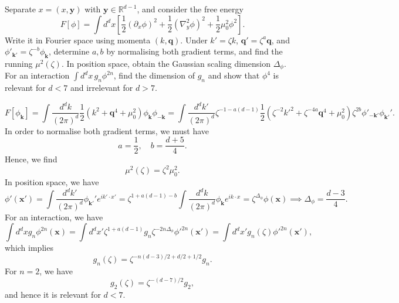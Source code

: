 Separate $x=(x,\mathbf y)$ with $\mathbf y\in\mathbb R^{d-1}$, and
consider the free energy
\begin{equation}
    F[\phi]=\int d^dx\left[
    \frac12(\partial_x\phi)^2
    +\frac12(\nabla_{\!y}^{2}\phi)^2
    +\frac12\mu_0^2\phi^2\right].
\end{equation}
Write it in Fourier space using momenta $(k,\mathbf q)$. Under
$k'=\zeta k$, $\mathbf q'=\zeta^a\mathbf q$, and
$\phi'_{\mathbf{k}'}=\zeta^{-b}\phi_\mathbf{k}$, determine $a,b$ by normalising both
gradient terms, and find the running $\mu^2(\zeta)$.
In position space, obtain the Gaussian scaling dimension $\Delta_\phi$.
For an interaction $\int d^dx\,g_n\phi^{2n}$, find the dimension of
$g_n$ and show that $\phi^4$ is relevant for $d<7$ and irrelevant
for $d>7$.
\begin{solution}
    \begin{equation}
        F[\phi_\mathbf{k}] = \int \frac{d^dk}{(2\pi)^d}\frac{1}{2}(k^2 + \mathbf{q}^4 + \mu_0^2) \phi_\mathbf{k}\phi_{-\mathbf{k}} = \int \frac{d^dk'}{(2\pi)^d}\zeta^{-1-a(d-1)}\frac{1}{2}(\zeta^{-2}k'^2 + \zeta^{-4a}\mathbf{q}^4 + \mu^2_0)\zeta^{2b}\phi'_{-\mathbf{k}'}\phi_{\mathbf{k}'}'.
    \end{equation}
    In order to normalise both gradient terms, we must have
    \begin{equation}
        a = \frac{1}{2}, \quad b = \frac{d+5}{4}.
    \end{equation}
    Hence, we find
    \begin{equation}
        \mu^2(\zeta) = \zeta^2\mu_0^2.
    \end{equation}
    In position space, we have
    \begin{equation}
        \phi'(\mathbf{x}') = \int\frac{d^dk'}{(2\pi)^d}\phi_{\mathbf{k}'}'e^{ik'\cdot x'} = \zeta^{1+a(d-1)-b}\int \frac{d^dk}{(2\pi)^d}\phi_\mathbf{k}e^{    ik\cdot x} = \zeta^{\Delta_\phi}\phi(\mathbf{x})  \implies \Delta_\phi = \frac{d-3}{4}.
    \end{equation}
    For an interaction, we have
    \begin{equation}
        \int d^dx g_n \phi^{2n}(\mathbf{x}) = \int d^dx'\zeta^{1+a(d-1)}g_n\zeta^{-2n\Delta_\phi}\phi'^{2n}(\mathbf{x}') = \int d^dx'g_n(\zeta)\phi'^{2n}(\mathbf{x}'),
    \end{equation}
    which implies
    \begin{equation}
        g_n(\zeta) = \zeta^{-n(d-3)/2 +d/2+1/2}g_n.
    \end{equation}
    For $n=2$, we have
    \begin{equation}
        g_2(\zeta) = \zeta^{-(d-7)/2}g_2,
    \end{equation}
    and hence it is relevant for $d<7$.

\end{solution}


